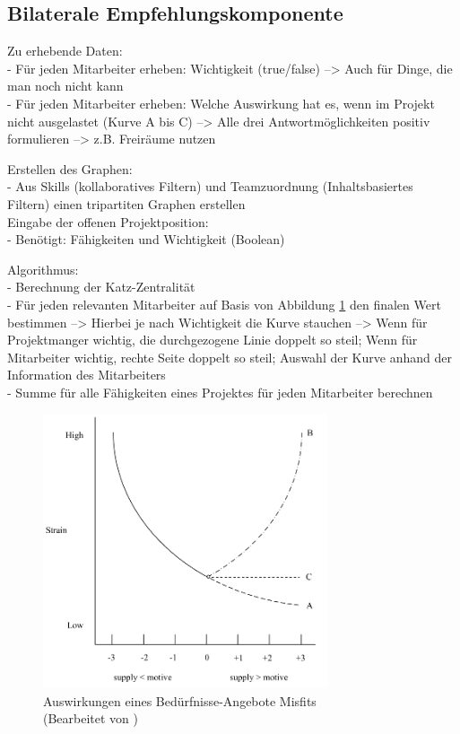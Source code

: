 \subsection{Bilaterale Empfehlungskomponente}
\label{ch:methodik:versuchsaufbau:bilateral}

\newpage
Zu erhebende Daten:\\
- Für jeden Mitarbeiter erheben: Wichtigkeit (true/false) --> Auch für Dinge, die man noch nicht kann\\
- Für jeden Mitarbeiter erheben: Welche Auswirkung hat es, wenn im Projekt nicht ausgelastet (Kurve A bis C) --> Alle drei Antwortmöglichkeiten positiv formulieren --> z.B. Freiräume nutzen

Erstellen des Graphen:\\
- Aus Skills (kollaboratives Filtern) und Teamzuordnung (Inhaltsbasiertes Filtern) einen tripartiten Graphen erstellen\\

Eingabe der offenen Projektposition:\\
- Benötigt: Fähigkeiten und Wichtigkeit (Boolean)

Algorithmus:\\
- Berechnung der Katz-Zentralität\\
- Für jeden relevanten Mitarbeiter auf Basis von Abbildung \ref{fig:methodik:abb2} den finalen Wert bestimmen --> Hierbei je nach Wichtigkeit die Kurve stauchen --> Wenn für Projektmanger wichtig, die durchgezogene Linie doppelt so steil; Wenn für Mitarbeiter wichtig, rechte Seite doppelt so steil; Auswahl der Kurve anhand der Information des Mitarbeiters\\
- Summe für alle Fähigkeiten eines Projektes für jeden Mitarbeiter berechnen

\begin{figure}[h]
	\centering
	\includegraphics[width=0.75\textwidth]{gfx/ueberschuss_supply_motive.png}
	\caption{Auswirkungen eines Bedürfnisse-Angebote Misfits \cite[S. 23]{edwards:2008}\\(Bearbeitet von \myName)}
	\label{fig:methodik:abb2}
\end{figure}

